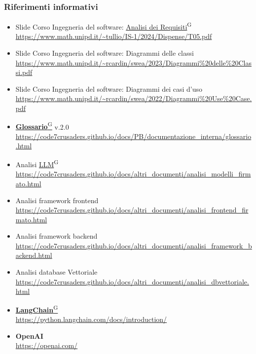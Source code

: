 \subsubsection{Riferimenti informativi}
\begin{itemize}
    \item Slide Corso Ingegneria del software: \href{https://code7crusaders.github.io/docs/PB/documentazione_interna/glossario.html#analisi-dei-requisiti}{Analisi dei Requisiti}\textsuperscript{G} \\ \url{https://www.math.unipd.it/~tullio/IS-1/2024/Dispense/T05.pdf}
    \item Slide Corso Ingegneria del software: Diagrammi delle classi \\ \url{https://www.math.unipd.it/~rcardin/swea/2023/Diagrammi%20delle%20Classi.pdf}
    \item Slide Corso Ingegneria del software: Diagrammi dei casi d'uso\\ \url{https://www.math.unipd.it/~rcardin/swea/2022/Diagrammi%20Use%20Case.pdf}
    \item \href{https://code7crusaders.github.io/docs/PB/documentazione_interna/glossario.html#glossario}{\textbf{Glossario}\textsuperscript{G}} v.2.0 \\ \url{https://code7crusaders.github.io/docs/PB/documentazione_interna/glossario.html}
    \item Analisi \href{https://code7crusaders.github.io/docs/PB/documentazione_interna/glossario.html#llm-large-language-model}{LLM}\textsuperscript{G} \\ \url{https://code7crusaders.github.io/docs/altri_documenti/analisi_modelli_firmato.html}
    \item Analisi framework frontend \\ \url{https://code7crusaders.github.io/docs/altri_documenti/analisi_frontend_firmato.html}
    \item Analisi framework backend \\ \url{https://code7crusaders.github.io/docs/altri_documenti/analisi_framework_backend.html}
    \item Analisi database Vettoriale \\ \url{https://code7crusaders.github.io/docs/altri_documenti/analisi_dbvettoriale.html}
    \item \href{https://code7crusaders.github.io/docs/PB/documentazione_interna/glossario.html#langchain}{\textbf{LangChain}\textsuperscript{G}} \\ \url{https://python.langchain.com/docs/introduction/}
    \item \textbf{OpenAI} \\ \url{https://openai.com/}
\end{itemize}
